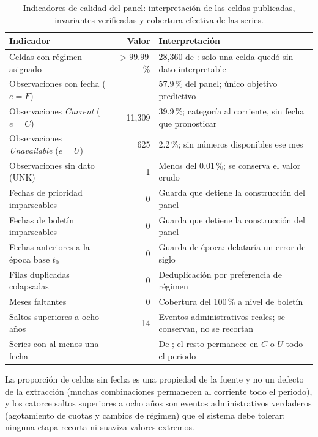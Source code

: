 \documentclass[12pt,letterpaper]{report}
\begin{document}
\begin{table}[htbp]
\centering
\footnotesize
\caption[Calidad del conjunto obtenido]{Indicadores de calidad del panel: interpretación de
las celdas publicadas, invariantes verificadas y cobertura efectiva de las series.}
\label{tab:calidad_obtencion}
\begin{tabular}{p{6.3cm}r p{6.0cm}}
\toprule
\rowcolor{uacjblue!15}
\textbf{Indicador} & \textbf{Valor} & \textbf{Interpretación} \\ \midrule
Celdas con régimen asignado & $>99.99$\,\% & 28{,}360 de \factNObsFmt{}: solo una celda quedó sin dato interpretable \\
Observaciones con fecha ($e=F$) & \factNObsFFmt{} & 57.9\,\% del panel; único objetivo predictivo \\
Observaciones \textit{Current} ($e=C$) & 11{,}309 & 39.9\,\%; categoría al corriente, sin fecha que pronosticar \\
Observaciones \textit{Unavailable} ($e=U$) & 625 & 2.2\,\%; sin números disponibles ese mes \\
Observaciones sin dato (UNK) & 1 & Menos del 0.01\,\%; se conserva el valor crudo \\
Fechas de prioridad imparseables & 0 & Guarda que detiene la construcción del panel \\
Fechas de boletín imparseables & 0 & Guarda que detiene la construcción del panel \\
Fechas anteriores a la época base $t_0$ & 0 & Guarda de época: delataría un error de siglo \\
Filas duplicadas colapsadas & 0 & Deduplicación por preferencia de régimen \\
Meses faltantes & 0 & Cobertura del 100\,\% a nivel de boletín \\
Saltos superiores a ocho años & 14 & Eventos administrativos reales; se conservan, no se recortan \\
Series con al menos una fecha & \factNSeriesWithF{} & De \factNSeriesStructural{}; el resto permanece en $C$ o $U$ todo el periodo \\
\bottomrule
\end{tabular}
\end{table}

La proporción de celdas sin fecha es una propiedad de la fuente y no un defecto de la extracción
(muchas combinaciones permanecen al corriente todo el periodo), y los catorce saltos superiores a
ocho años son eventos administrativos verdaderos (agotamiento de cuotas y cambios de régimen) que
el sistema debe tolerar: ninguna etapa recorta ni suaviza valores extremos.
\end{document}
